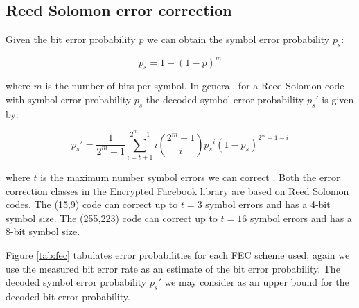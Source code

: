 \subsection{Reed Solomon error correction}

Given the bit error probability $p$ we can obtain the symbol error probability $p_s$:

\begin{equation}
    p_s = 1 - (1-p)^m
\end{equation}

where $m$ is the number of bits per symbol. In general, for a Reed Solomon code with symbol error probability $p_s$ the decoded symbol error probability $p_s'$ is given by:

\begin{equation}
    p_s' = \frac{1}{2^m -1} \sum^{2^m - 1}_{i = t+1} i {{2^m - 1}\choose{i}} {p_s}^i (1-{p_s})^{2^m - 1 - i}
\end{equation}

where $t$ is the maximum number symbol errors we can correct \cite{rsfec-decode}. Both the error correction classes in the Encrypted Facebook library are based on Reed Solomon codes. The (15,9) code can correct up to $t=3$ symbol errors and has a 4-bit symbol size. The (255,223) code can correct up to $t=16$ symbol errors and has a 8-bit symbol size.

Figure \ref{tab:fec} tabulates error probabilities for each FEC scheme used; again we use the
measured bit error rate as an estimate of the bit error probability. The decoded symbol error probability $p_s'$ we may consider as an upper bound for the decoded bit error probability. 

